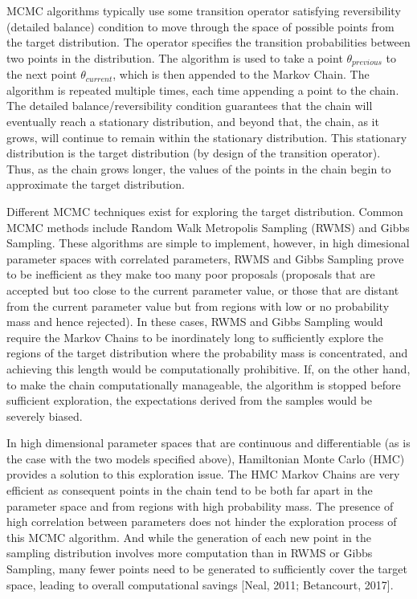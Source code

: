 \documentclass[12pt,letterpaper,reqno,fleqn]{article}
\begin{document}
MCMC algorithms typically use some transition operator satisfying reversibility (detailed balance) condition to move through the space of possible points from the target distribution. The operator specifies the transition probabilities between two points in the distribution. The algorithm is used to take a point $\theta_{previous}$ to the next point $\theta_{current}$, which is then appended to the Markov Chain. The algorithm is repeated multiple times, each time appending a point to the chain. The detailed balance/reversibility condition guarantees that the chain will eventually reach a stationary distribution, and beyond that, the chain, as it grows, will continue to remain within the stationary distribution. This stationary distribution is the target distribution (by design of the transition operator). Thus, as the chain grows longer, the values of the points in the chain begin to approximate the target distribution.

Different MCMC techniques exist for exploring the target distribution. Common MCMC methods include Random Walk Metropolis Sampling (RWMS) and Gibbs Sampling. These algorithms are simple to implement, however, in high dimesional parameter spaces with correlated parameters, RWMS and Gibbs Sampling prove to be inefficient as they make too many poor proposals (proposals that are accepted but too close to the current parameter value, or those that are distant from the current parameter value but from regions with low or no probability mass and hence rejected). In these cases, RWMS and Gibbs Sampling would require the Markov Chains to be inordinately long to sufficiently explore the regions of the target distribution where the probability mass is concentrated, and achieving this length would be computationally prohibitive. If, on the other hand, to make the chain computationally manageable, the algorithm is stopped before sufficient exploration, the expectations derived from the samples would be severely biased.

In high dimensional parameter spaces that are continuous and differentiable (as is the case with the two models specified above), Hamiltonian Monte Carlo (HMC) provides a solution to this exploration issue. The HMC Markov Chains are very efficient as consequent points in the chain tend to be both far apart in the parameter space and from regions with high probability mass. The presence of high correlation between parameters does not hinder the exploration process of this MCMC algorithm. And while the generation of each new point in the sampling distribution involves more computation than in RWMS or Gibbs Sampling, many fewer points need to be generated to sufficiently cover the target space, leading to overall computational savings [Neal, 2011; Betancourt, 2017].
\end{document}
